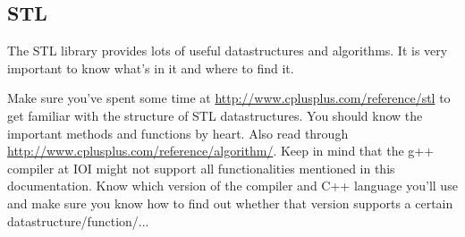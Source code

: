 \subsection{STL}
The STL library provides lots of useful datastructures and algorithms. It is very important to know what's in it and where to find it.

Make sure you've spent some time at \url{http://www.cplusplus.com/reference/stl} to get familiar with the structure of STL datastructures. 
You should know the important methods and functions by heart. Also read through \url{http://www.cplusplus.com/reference/algorithm/}.
Keep in mind that the g++ compiler at IOI might not support all functionalities mentioned in this documentation. Know which version of the compiler and C++ language you'll use and make sure you know how to find out whether that version supports a certain datastructure/function/...
